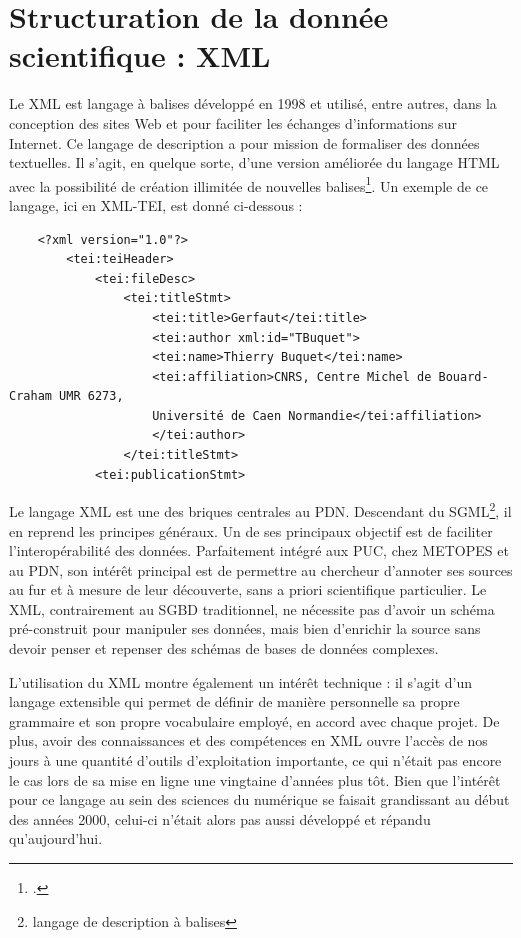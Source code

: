 \documentclass[a4paper,12pt,twoside]{book}
\begin{document}
    \section{Structuration de la donnée scientifique : XML}
    
    Le \acrfull{XML} est langage à balises développé en  1998 et utilisé, entre autres, dans la conception des sites Web et pour faciliter les échanges d'informations sur Internet. Ce langage de description a pour mission de formaliser des données textuelles. Il s'agit, en quelque sorte, d'une version améliorée du langage HTML avec la possibilité de création illimitée de nouvelles balises\footcite{def-xml}. Un exemple de ce langage, ici en XML-TEI, est donné ci-dessous :
    
    \begin{verbatim}
    <?xml version="1.0"?>
        <tei:teiHeader>
            <tei:fileDesc>
                <tei:titleStmt>
                    <tei:title>Gerfaut</tei:title>
                    <tei:author xml:id="TBuquet">
                    <tei:name>Thierry Buquet</tei:name>
                    <tei:affiliation>CNRS, Centre Michel de Bouard-Craham UMR 6273,
                    Université de Caen Normandie</tei:affiliation>
                    </tei:author>
                </tei:titleStmt>
            <tei:publicationStmt>
    \end{verbatim}
    
    Le langage \acrshort{XML} est une des briques centrales au \acrshort{PDN}. Descendant du \acrfull{SGML}\footnote{langage de description à balises}, il en reprend les principes généraux. Un de ses principaux objectif est de faciliter l'interopérabilité des données. Parfaitement intégré aux \acrshort{PUC}, chez \acrshort{METOPES} et au \acrshort{PDN}, son intérêt principal est de permettre au chercheur d'annoter ses sources au fur et à mesure de leur découverte, sans a priori scientifique particulier. Le \acrshort{XML}, contrairement au \acrfull{SGBD} traditionnel, ne nécessite pas d'avoir un schéma pré-construit pour manipuler ses données, mais bien d'enrichir la source sans devoir penser et repenser des schémas de bases de données complexes.
    
    L'utilisation du \acrshort{XML} montre également un intérêt technique : il s'agit d'un langage \og extensible\fg{} qui permet de définir de manière personnelle sa propre \og grammaire\fg{} et son propre \og vocabulaire\fg{} employé, en accord avec chaque projet. De plus, avoir des connaissances et des compétences en XML ouvre l'accès de nos jours à une quantité d'outils d'exploitation importante, ce qui n'était pas encore le cas lors de sa mise en ligne une vingtaine d'années plus tôt. Bien que l'intérêt pour ce langage au sein des sciences du numérique se faisait grandissant au début des années 2000, celui-ci n'était alors pas aussi développé et répandu qu'aujourd'hui.
    
\end{document}
